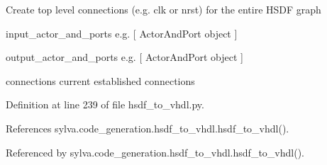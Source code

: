 \begin{DoxyVerb}Create top level connections (e.g. clk or nrst) for the entire HSDF graph

  input_actor_and_ports
    e.g. [ ActorAndPort object ]

  output_actor_and_ports
    e.g. [ ActorAndPort object ]

  connections
    current established connections
\end{DoxyVerb}
 

Definition at line 239 of file hsdf\+\_\+to\+\_\+vhdl.\+py.



References sylva.\+code\+\_\+generation.\+hsdf\+\_\+to\+\_\+vhdl.\+hsdf\+\_\+to\+\_\+vhdl().



Referenced by sylva.\+code\+\_\+generation.\+hsdf\+\_\+to\+\_\+vhdl.\+hsdf\+\_\+to\+\_\+vhdl().


